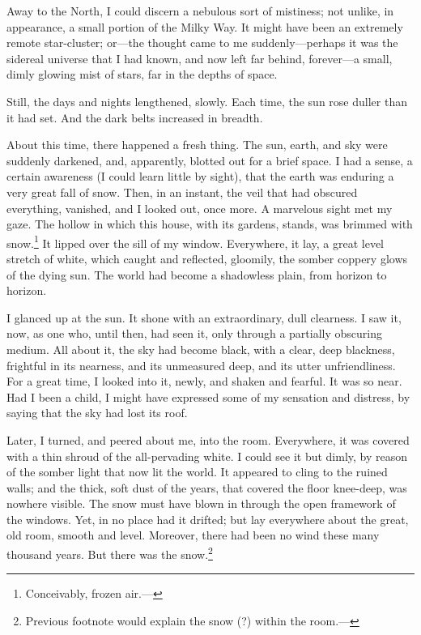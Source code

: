 Away to the North, I could discern a nebulous sort of mistiness; not unlike, in appearance, a small portion of the Milky Way. It might have been an extremely remote star-cluster; or---the thought came to me suddenly---perhaps it was the sidereal universe that I had known, and now left far behind, forever---a small, dimly glowing mist of stars, far in the depths of space.

Still, the days and nights lengthened, slowly. Each time, the sun rose duller than it had set. And the dark belts increased in breadth.

About this time, there happened a fresh thing. The sun, earth, and sky were suddenly darkened, and, apparently, blotted out for a brief space. I had a sense, a certain awareness (I could learn little by sight), that the earth was enduring a very great fall of snow. Then, in an instant, the veil that had obscured everything, vanished, and I looked out, once more. A marvelous sight met my gaze. The hollow in which this house, with its gardens, stands, was brimmed with snow.\footnote{Conceivably, frozen air.---} It lipped over the sill of my window. Everywhere, it lay, a great level stretch of white, which caught and reflected, gloomily, the somber coppery glows of the dying sun. The world had become a shadowless plain, from horizon to horizon.

I glanced up at the sun. It shone with an extraordinary, dull clearness. I saw it, now, as one who, until then, had seen it, only through a partially obscuring medium. All about it, the sky had become black, with a clear, deep blackness, frightful in its nearness, and its unmeasured deep, and its utter unfriendliness. For a great time, I looked into it, newly, and shaken and fearful. It was so near. Had I been a child, I might have expressed some of my sensation and distress, by saying that the sky had lost its roof.

Later, I turned, and peered about me, into the room. Everywhere, it was covered with a thin shroud of the all-pervading white. I could see it but dimly, by reason of the somber light that now lit the world. It appeared to cling to the ruined walls; and the thick, soft dust of the years, that covered the floor knee-deep, was nowhere visible. The snow must have blown in through the open framework of the windows. Yet, in no place had it drifted; but lay everywhere about the great, old room, smooth and level. Moreover, there had been no wind these many thousand years. But there was the snow.\footnote{Previous footnote would explain the snow (?) within the room.---}

